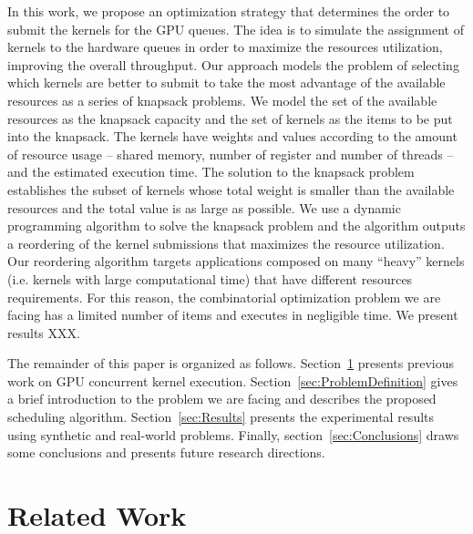 \documentclass[conference]{IEEEtran}
\begin{document}
In this work, we propose an optimization strategy that determines the order to submit the kernels for the GPU queues. The idea is to simulate the assignment of kernels to the hardware queues in order to maximize the resources utilization, improving the overall throughput. Our approach models the problem of selecting which kernels are better to submit to take the most advantage of the available resources as a series of knapsack problems. We model the set of the available resources as the knapsack capacity and the set of kernels as the items to be put into the knapsack. The kernels have weights and values 
according to the amount of resource usage -- shared memory, number of register and number of threads -- and the estimated execution time. The solution to the knapsack problem establishes the subset of kernels whose total weight is smaller than the available resources and the total value is as large as possible. We use a dynamic programming algorithm to solve the knapsack problem and the algorithm outputs a reordering of the kernel submissions that maximizes the resource utilization. Our reordering algorithm targets applications composed on many “heavy” kernels (i.e. kernels with large computational time) that have different resources requirements. For this reason, the combinatorial optimization problem we are facing has a limited number of items and executes in negligible time.  We present results XXX.

The remainder of this paper is organized as follows.
Section~\ref{sec:Related} presents previous work on GPU concurrent kernel execution.
Section~\ref{sec:ProblemDefinition} gives a brief introduction to the problem we are facing and describes the proposed scheduling algorithm.
Section~\ref{sec:Results} presents the experimental results using synthetic and real-world problems. 
Finally, section~\ref{sec:Conclusions} draws some conclusions and presents future research directions.


\section{Related Work}
\label{sec:Related}
\end{document}
